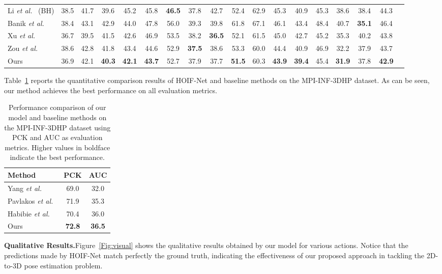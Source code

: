 \documentclass{bmvc2k}
\begin{document}
\begin{table*}[!htb]
\begin{tabular}{l*{17}{c}}
Li \textit{et al.}~\cite{ChenLiLee:2020} (BH) & 38.5 & 41.7 & 39.6 & 45.2 & 45.8 & \textbf{46.5} & 37.8 & 42.7 & 52.4 & 62.9 & 45.3 & 40.9 & 45.3 & 38.6 & 38.4 & 44.3\\
Banik \textit{et al.}~\cite{Banik:2021} & 38.4 & 43.1 & 42.9 & 44.0 & 47.8 & 56.0 & 39.3 & 39.8 & 61.8 & 67.1 & 46.1 & 43.4 & 48.4 & 40.7 & \textbf{35.1} & 46.4\\
Xu \textit{et al.}~\cite{YuanluXu:2021} & 36.7 & 39.5 & 41.5 & 42.6 & 46.9 & 53.5 & 38.2 & \textbf{36.5} & 52.1 & 61.5 & 45.0 & 42.7 & 45.2 & 35.3 & 40.2 & 43.8\\
Zou \textit{et al.}~\cite{zou2020high} &38.6 &42.8& 41.8 &43.4 &44.6& 52.9& \textbf{37.5}& 38.6 &53.3 &60.0& 44.4& 40.9& 46.9 &32.2 &37.9 &43.7\\
\midrule
Ours &36.9 &42.1&\textbf{40.3} &\textbf{42.1} &\textbf{43.7} &52.7&37.9 &37.7 &\textbf{51.5} &60.3  &\textbf{43.9}&\textbf{39.4} & 45.4 & \textbf{31.9} & 37.8 & \textbf{42.9} \\
\bottomrule
\end{tabular}
\label{Tab:Result2}
\end{table*}

Table~\ref{Tab:MPI} reports the quantitative comparison results of HOIF-Net and baseline methods on the MPI-INF-3DHP dataset. As can be seen, our method achieves the best performance on all evaluation metrics.

\begin{table}[!htb]
\caption{Performance comparison of our model and baseline methods on the MPI-INF-3DHP dataset using PCK and AUC as evaluation metrics. Higher values in boldface indicate the best performance.}
\small
\setlength{\tabcolsep}{2.5pt}
\medskip
\centering
\begin{tabular}{lcc}
\toprule
Method & PCK & AUC\\
\midrule
Yang \textit{et al.}~\cite{yang20183d} & 69.0 & 32.0 \\
Pavlakos \textit{et al.}~\cite{pavlakos2018ordinal}  & 71.9 & 35.3 \\
Habibie \textit{et al.}~\cite{Habibie:19}  & 70.4 & 36.0 \\
\midrule
Ours & \textbf{72.8} &\textbf{36.5} \\
\bottomrule
\end{tabular}
\label{Tab:MPI}
\end{table}

\medskip\noindent\textbf{Qualitative Results.}\quad Figure~\ref{Fig:visual} shows the qualitative results obtained by our model for various actions. Notice that the predictions made by HOIF-Net match perfectly the ground truth, indicating the effectiveness of our proposed approach in tackling the 2D-to-3D pose estimation problem.
\end{document}
